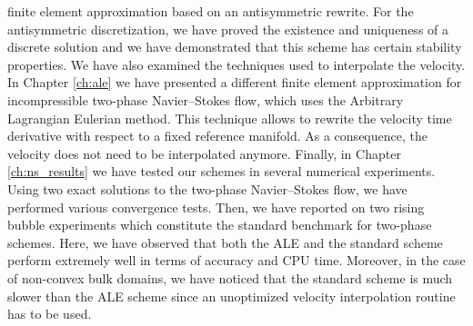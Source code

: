 finite element approximation based on an antisymmetric rewrite. For the
antisymmetric discretization, we have proved the existence and uniqueness of a
discrete solution and we have demonstrated that this scheme has certain
stability properties. We have also examined the techniques used to interpolate
the velocity. In Chapter \ref{ch:ale} we have presented a different finite
element approximation for incompressible two-phase Navier--Stokes flow, which
uses the Arbitrary Lagrangian Eulerian method. This technique allows to
rewrite the velocity time derivative with respect to a fixed reference
manifold. As a consequence, the velocity does not need to be interpolated
anymore. Finally, in Chapter \ref{ch:ns_results} we have tested our schemes in
several numerical experiments. Using two exact solutions to the two-phase
Navier--Stokes flow, we have performed various convergence tests. Then, we have
reported on two rising bubble experiments which constitute the standard
benchmark for two-phase schemes. Here, we have observed that both the ALE and
the standard scheme perform extremely well in terms of accuracy and CPU time.
Moreover, in the case of non-convex bulk domains, we have noticed that the
standard scheme is much slower than the ALE scheme since an unoptimized velocity
interpolation routine has to be used.